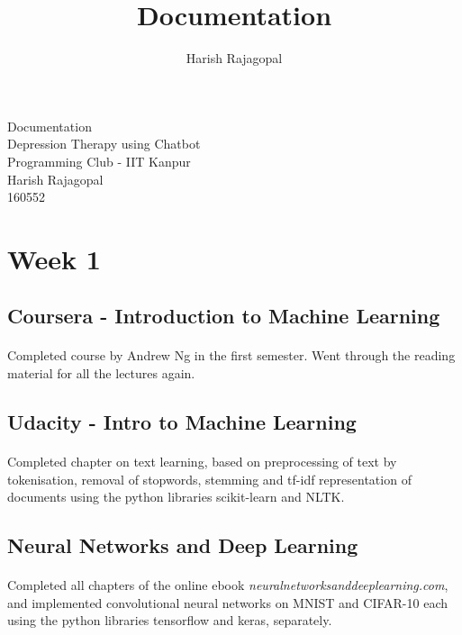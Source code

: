 \documentclass{article}
\title{Documentation}
\author{Harish Rajagopal}
\begin{document}
    
    \begin{center}
    {\fontsize{50}{60}\selectfont Documentation}\\[3cm]
    {\fontsize{21}{30}\selectfont Depression Therapy using Chatbot\\[-1mm]
    Programming Club - IIT Kanpur\\[2cm]
    Harish Rajagopal\\[+2mm]
    160552}
    \end{center}
    
    \newpage
    \section*{\fontsize{25}{30}\selectfont \textbf{Week 1}}
        
        \vspace{+6mm}
        \subsection*{\fontsize{16}{20}\selectfont Coursera - Introduction to Machine Learning}
        	\vspace{+1mm}\paragraph{}{\fontsize{13}{16}\selectfont Completed course by Andrew Ng in the first semester. Went through the reading material for all the lectures again.}\\[-3mm]
        
        \subsection*{\fontsize{16}{20}\selectfont Udacity - Intro to Machine Learning}
        	\vspace{+1mm}\paragraph{}{\fontsize{13}{16}\selectfont Completed chapter on text learning, based on preprocessing of text by tokenisation, removal of stopwords, stemming and tf-idf representation of documents using the python libraries scikit-learn and NLTK.}\\[-3mm]
        
        \subsection*{\fontsize{16}{20}\selectfont Neural Networks and Deep Learning}
        	\vspace{+1mm}\paragraph{}{\fontsize{13}{16}\selectfont Completed all chapters of the online ebook \textit{neuralnetworksanddeeplearning.com}, and implemented convolutional neural networks on MNIST and CIFAR-10 each using the python libraries tensorflow and keras, separately.}\\[-3mm]
        
\end{document}
